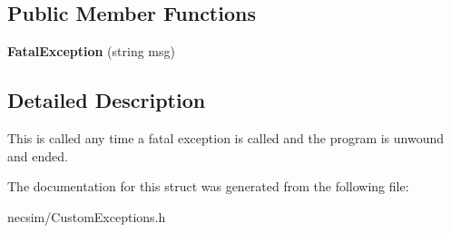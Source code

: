 \subsection*{Public Member Functions}
\begin{DoxyCompactItemize}
\item 
{\bfseries Fatal\+Exception} (string msg)\hypertarget{struct_fatal_exception_a0a95484803080c915b5a728b9ab863c6}{}\label{struct_fatal_exception_a0a95484803080c915b5a728b9ab863c6}

\end{DoxyCompactItemize}


\subsection{Detailed Description}
This is called any time a fatal exception is called and the program is unwound and ended. 

The documentation for this struct was generated from the following file\+:\begin{DoxyCompactItemize}
\item 
necsim/Custom\+Exceptions.\+h\end{DoxyCompactItemize}
